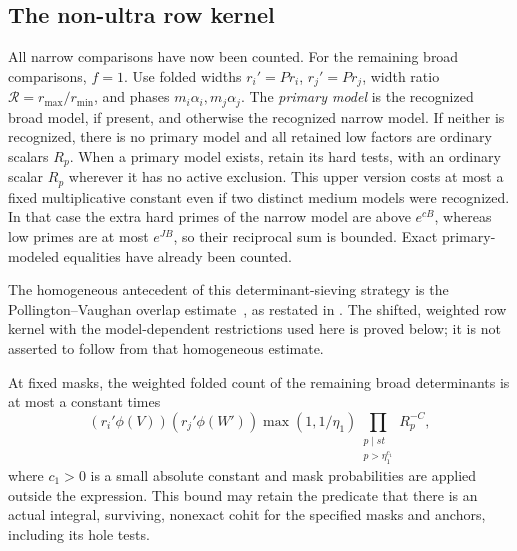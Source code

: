 \subsection{The non-ultra row kernel}

All narrow comparisons have now been counted. For the remaining broad
comparisons, $f=1$. Use folded widths
$r_i'=Pr_i$, $r_j'=Pr_j$, width ratio
$\mathcal R=r_{\max}/r_{\min}$, and phases
$m_i\alpha_i,m_j\alpha_j$. The \emph{primary model} is the recognized
broad model, if present, and otherwise the recognized narrow model.
If neither is recognized, there is no primary model and all retained
low factors are ordinary scalars $R_p$. When a primary model exists,
retain its hard tests, with an ordinary scalar $R_p$ wherever it has no
active exclusion. This upper version costs at most a fixed multiplicative
constant even if two distinct medium models were recognized. In that
case the extra hard primes of the narrow model are above $e^{cB}$,
whereas low primes are at most $e^{JB}$, so their reciprocal sum is
bounded. Exact primary-modeled equalities have already been counted.

The homogeneous antecedent of this determinant-sieving strategy is the
Pollington--Vaughan overlap estimate~\cite{PV1990}, as restated in
\cite[Lemma~5.3]{KM2020}. The shifted, weighted row kernel with the
model-dependent restrictions used here is proved below; it is not
asserted to follow from that homogeneous estimate.

\begin{lemma}\label{dir:row-kernel}
At fixed masks, the weighted folded count of the remaining broad
determinants is at most a constant times
\begin{equation}\label{eq:row-kernel}
 (r_i'\phi(V))(r_j'\phi(W'))
 \max(1,1/\eta_1)
 \prod_{\substack{p\mid st\\p>\eta_1^{c_1}}}R_p^{-C},
\end{equation}
where $c_1>0$ is a small absolute constant and mask probabilities are
applied outside the expression. This bound may retain the predicate
that there is an actual integral, surviving, nonexact cohit for the
specified masks and anchors, including its hole tests.
\end{lemma}

